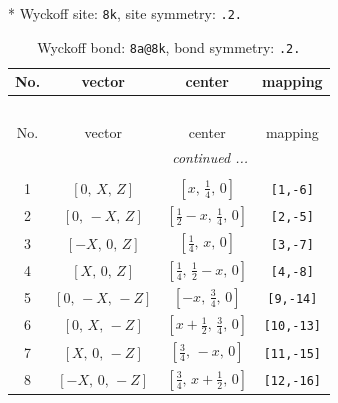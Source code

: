 \documentclass[fleqn,8pt]{jsarticle}
\begin{document}
* Wyckoff site: {\tt 8k}, site symmetry: {\tt .2.}
\renewcommand{\arraystretch}{1.2}
\begin{longtable}{cccc}
\caption{Wyckoff bond: {\tt 8a@8k}, bond symmetry: {\tt .2.}}
 \\
 \hline \hline
No. & vector & center & mapping \\ \hline \endfirsthead

\multicolumn{3}{l}{\tablename\ \thetable{}} \\
 \hline \hline
No. & vector & center & mapping \\ \hline \endhead

 \hline \hline
\multicolumn{3}{r}{\footnotesize\it continued ...} \\ \endfoot

 \hline \hline
\multicolumn{3}{r}{} \\ \endlastfoot

1 & $\left[ 0,\, X,\, Z \right]$ & $\left[ x,\, \frac{1}{4},\, 0 \right]$ & {\tt [1,-6]} \\ \hline
2 & $\left[ 0,\, - X,\, Z \right]$ & $\left[ \frac{1}{2} - x,\, \frac{1}{4},\, 0 \right]$ & {\tt [2,-5]} \\ \hline
3 & $\left[ - X,\, 0,\, Z \right]$ & $\left[ \frac{1}{4},\, x,\, 0 \right]$ & {\tt [3,-7]} \\ \hline
4 & $\left[ X,\, 0,\, Z \right]$ & $\left[ \frac{1}{4},\, \frac{1}{2} - x,\, 0 \right]$ & {\tt [4,-8]} \\ \hline
5 & $\left[ 0,\, - X,\, - Z \right]$ & $\left[ - x,\, \frac{3}{4},\, 0 \right]$ & {\tt [9,-14]} \\ \hline
6 & $\left[ 0,\, X,\, - Z \right]$ & $\left[ x + \frac{1}{2},\, \frac{3}{4},\, 0 \right]$ & {\tt [10,-13]} \\ \hline
7 & $\left[ X,\, 0,\, - Z \right]$ & $\left[ \frac{3}{4},\, - x,\, 0 \right]$ & {\tt [11,-15]} \\ \hline
8 & $\left[ - X,\, 0,\, - Z \right]$ & $\left[ \frac{3}{4},\, x + \frac{1}{2},\, 0 \right]$ & {\tt [12,-16]} \\
\end{longtable}
\renewcommand{\arraystretch}{1.2}
\end{document}
